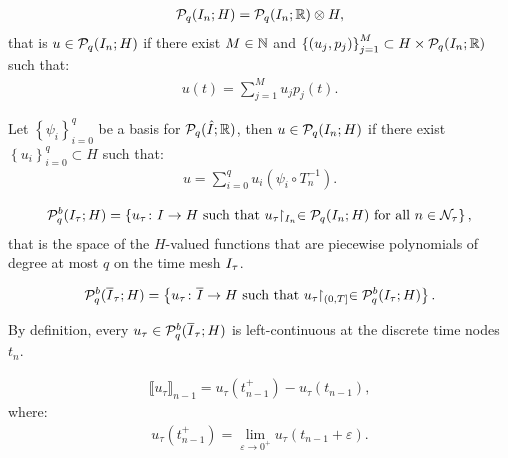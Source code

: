 \begin{definition}[$\SpacePolynomials{q}(I_n; H)$]
    \begin{align}
        \mathcal{P}_{q}(I_n; H) = \mathcal{P}_{q}(I_n; \mathbb{R}) \otimes H,
    \end{align}
    that is $u \in \mathcal{P}_{q}(I_n; H)$ if there exist $M \in \mathbb{N}$ and $\left\{ (u_j, p_j) \right\}_{j = 1}^M \subset H \times \mathcal{P}_{q}(I_n; \mathbb{R})$ such that:
    \begin{align}
        u(t) = \sum_{j = 1}^M u_j p_j(t).
    \end{align}
\end{definition}

Let $\left\{ \psi_i \right\}_{i = 0}^q$ be a basis for $\mathcal{P}_{q}(\hat{I}; \mathbb{R})$, then $u \in \mathcal{P}_{q}(I_n; H)$ if there exist $\left\{ u_i \right\}_{i = 0}^q \subset H$ such that:
\begin{align} %
    u = \sum_{i = 0}^q u_i (\psi_i \circ T_n^{-1}).
\end{align}

\begin{definition}
    \begin{align}
        \mathcal{P}_{q}^b(I_{\tau}; H) = \left\{ u_{\tau} \colon I \rightarrow H \text{ such that } u_{\tau} \!\!\restriction_{I_n} \in \mathcal{P}_{q}(I_n; H) \text{ for all } n \in \mathcal{N}_{\tau} \right\},
    \end{align}
    that is the space of the $H$-valued functions that are piecewise polynomials of degree at most $q$ on the time mesh $I_{\tau}$.
\end{definition}

\begin{definition}
    \begin{align}
        \mathcal{P}_{q}^b(\overline{I}_{\tau}; H) = \left\{ u_{\tau} \colon \overline{I} \rightarrow H \text{ such that } u_{\tau} \!\!\restriction_{(0, T]} \in \mathcal{P}_{q}^b(I_{\tau}; H) \right\}.
    \end{align}
\end{definition}

By definition, every $u_{\tau} \in \mathcal{P}_{q}^b(\overline{I}_{\tau}; H)$ is left-continuous at the discrete time nodes $t_n$.

\newpage
\begin{definition} \label{def:time_jumps}
    \begin{align}
        \llbracket u_{\tau} \rrbracket_{n - 1} = u_{\tau}(t_{n - 1}^+) - u_{\tau}(t_{n - 1}),
    \end{align}
    where:
    \begin{align}
        u_{\tau}(t_{n - 1}^+) = \lim_{\varepsilon \rightarrow 0^+} u_{\tau}(t_{n - 1} + \varepsilon).
    \end{align}
\end{definition}

